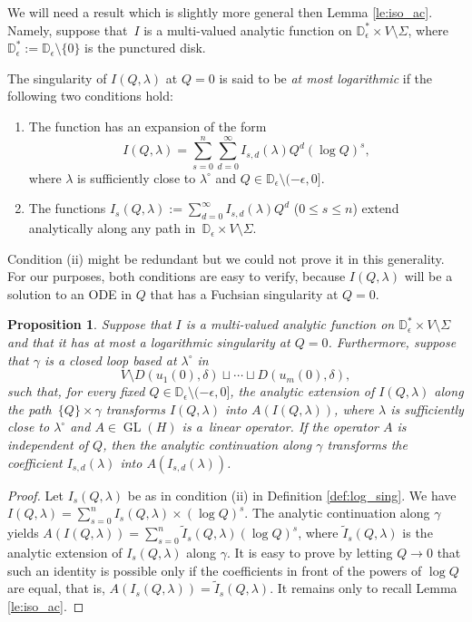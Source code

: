 \documentclass[pdftex]{sigma}
\numberwithin{equation}{section}
\newtheorem{Proposition}[Theorem]{Proposition}
\begin{document}
We will need a result which is slightly more general then Lemma \ref{le:iso_ac}. Namely, suppose that~$I$ is a multi-valued analytic function on $\mathbb{D}_\epsilon^*\times V\setminus{\Sigma}$, where $\mathbb{D}_\epsilon^*:=\mathbb{D}_\epsilon\setminus{\{0\}}$ is the punctured disk.
\begin{Definition}\label{def:log_sing}
The singularity of $I(Q,\lambda)$ at $Q=0$ is said to be {\em at most logarithmic} if the following two conditions hold:
\begin{enumerate}\itemsep=0pt
\item[(i)] The function has an expansion of the form
\[
I(Q,\lambda) =\sum_{s=0}^n \sum_{d=0}^\infty I_{s,d}(\lambda) Q^d (\log Q)^s,
\]
where $\lambda$ is sufficiently close to $\lambda^\circ$ and $Q\in \mathbb{D}_\epsilon\setminus{(-\epsilon,0]}$.
\item[(ii)] The functions $I_s(Q,\lambda):=\sum_{d=0}^\infty I_{s,d}(\lambda) Q^d$ ($0\leq s\leq n$) extend analytically along any path in~$\mathbb{D}_\epsilon\times V\setminus{\Sigma}$.
\end{enumerate}
\end{Definition}
\begin{Remark}
Condition (ii) might be redundant but we could not prove it in this generality. For our purposes, both conditions are easy to verify, because $I(Q,\lambda)$ will be a solution to an ODE in $Q$ that has a Fuchsian singularity at $Q=0$.
\end{Remark}
\begin{Proposition}\label{prop:iso_ac}
Suppose that $I$ is a multi-valued analytic function on $\mathbb{D}_\epsilon^*\times V\setminus{\Sigma}$ and that it has at most a logarithmic singularity at $Q=0$. Furthermore, suppose that $\gamma$ is a closed loop based at $\lambda^\circ$ in
\[
V\setminus{D(u_1(0),\delta)\sqcup\cdots \sqcup D(u_m(0),\delta)},
\]
such that, for every fixed $Q\in \mathbb{D}_\epsilon\setminus{(-\epsilon,0]}$, the analytic extension of $I(Q,\lambda)$ along the path~${\{Q\}\times \gamma}$ transforms $I(Q,\lambda)$ into $A(I(Q,\lambda))$, where $\lambda$ is sufficiently close to $\lambda^\circ$ and $A\in \operatorname{GL}(H)$ is a~linear operator. If the operator $A$ is independent of $Q$, then the analytic continuation along $\gamma$ transforms the coefficient $I_{s,d}(\lambda)$ into $A(I_{s,d}(\lambda))$.
\end{Proposition}
\begin{proof}
Let $I_s(Q,\lambda)$ be as in condition (ii) in Definition \ref{def:log_sing}. We have $I(Q,\lambda) = \sum_{s=0}^n I_s(Q,\lambda) \allowbreak\times(\log Q)^s$. The analytic continuation along $\gamma$ yields $A(I(Q,\lambda)) = \sum_{s=0}^n \widetilde{I}_s(Q,\lambda) (\log Q)^s$, where $\widetilde{I}_s(Q,\lambda)$ is the analytic extension of $I_s(Q,\lambda)$ along $\gamma$. It is easy to prove by letting $Q\to 0$ that such an identity is possible only if the coefficients in front of the powers of $\log Q$ are equal, that is, $A(I_s(Q,\lambda)) = \widetilde{I}_s(Q,\lambda)$. It remains only to recall Lemma \ref{le:iso_ac}.
\end{proof}
\end{document}
